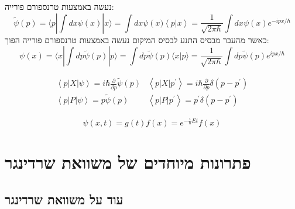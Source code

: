 \documentclass{tstextbook}
\begin{document}
\begin{proposition}
נעשה באמצעות טרנספורם פורייה:
$$\widetilde{\psi}(p)=\langle p|\int d x\psi(x)|x  \rangle =\int d x\psi\left(x)\left\langle p\right|x\right\rangle=\frac{1}{\sqrt{2\pi\hbar}}\int d x\psi\left(x\right)e^{-i p x/\hbar}$$
כאשר מהעבר מבסיס התנע לבסיס המיקום נעשה באמצעות טרנספורם פורייה הפוך:
$$\psi(x)=\langle x|\int d p\widetilde{\psi}(p)|p\rangle=\int d p\widetilde{\psi}(p) \langle x|p\rangle=\frac{1}{\sqrt{2\pi\hbar}}\int d p\widetilde{\psi}(p)e^{i p x/\hbar}$$

\end{proposition}
\begin{proposition}
\begin{gather*}\left\langle  p|X|\psi \right\rangle=i\hbar{\frac{\partial}{\partial p}}\tilde{\psi}(p)&\left\langle  p|X|p^{\prime} \right\rangle=i\hbar{\frac{\partial}{\partial p}}\delta\left( p-p^{\prime} \right)\\ \left\langle  p|P|\psi \right\rangle=p\tilde{\psi}(p)& \left\langle  p|P|p^{\prime} \right\rangle=p^{\prime}\delta\left( p-p^{\prime} \right) 
\end{gather*}

\end{proposition}
\begin{proposition}
$$\psi(x,t)=g(t)f(x)=e^{-{\frac{i}{\hbar}}E t}f(x)$$

\end{proposition}
\chapter{פתרונות מיוחדים של משוואת שרדינגר}

\section{עוד על משוואת שרדינגר}
\end{document}

